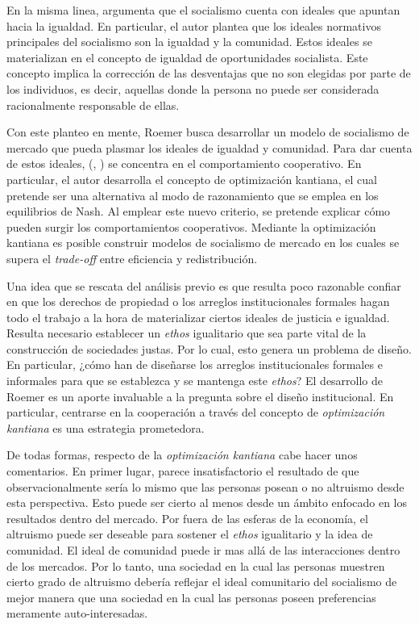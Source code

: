 En la misma linea, \citet{Cohen_2014c} argumenta que el socialismo cuenta con ideales que apuntan hacia la igualdad. En particular, el autor plantea que los ideales normativos principales del socialismo son la igualdad y la comunidad. Estos ideales se materializan en el concepto de igualdad de oportunidades socialista. Este concepto implica la corrección de las desventajas que no son elegidas por parte de los individuos, es decir, aquellas donde la persona no puede ser considerada racionalmente responsable de ellas.

Con este planteo en mente, Roemer busca desarrollar un modelo de socialismo de mercado que pueda plasmar los ideales de igualdad y comunidad. Para dar cuenta de estos ideales, \citeauthor{Roemer_2019} (\citeyear{Roemer_2019}, \citeyear{Roemer_2021a}) se concentra en el comportamiento cooperativo. En particular, el autor desarrolla el concepto de optimización kantiana, el cual pretende ser una alternativa al modo de razonamiento que se emplea en los equilibrios de Nash. Al emplear este nuevo criterio, se pretende explicar cómo pueden surgir los comportamientos cooperativos. Mediante la optimización kantiana es posible construir modelos de socialismo de mercado en los cuales se supera el \textit{trade-off} entre eficiencia y redistribución.

Una idea que se rescata del análisis previo es que resulta poco razonable confiar en que los derechos de propiedad o los arreglos institucionales formales hagan todo el trabajo a la hora de materializar ciertos ideales de justicia e igualdad. Resulta necesario establecer un \textit{ethos} igualitario que sea parte vital de la construcción de sociedades justas. Por lo cual, esto genera un problema de diseño. En particular, ¿cómo han de diseñarse los arreglos institucionales formales e informales para que se establezca y se mantenga este \textit{ethos}? El desarrollo de Roemer es un aporte invaluable a la pregunta sobre el diseño institucional. En particular, centrarse en la cooperación a través del concepto de \textit{optimización kantiana} es una estrategia prometedora. 

De todas formas, respecto de la \textit{optimización kantiana} cabe hacer unos comentarios. En primer lugar, parece insatisfactorio el resultado de que observacionalmente sería lo mismo que las personas posean o no altruismo desde esta perspectiva. Esto puede ser cierto al menos desde un ámbito enfocado en los resultados dentro del mercado. Por fuera de las esferas de la economía, el altruismo puede ser deseable para sostener el \textit{ethos} igualitario y la idea de comunidad. El ideal de comunidad puede ir mas allá de las interacciones dentro de los mercados. Por lo tanto, una sociedad en la cual las personas muestren cierto grado de altruismo debería reflejar el ideal comunitario del socialismo de mejor manera que una sociedad en la cual las personas poseen preferencias meramente auto-interesadas.

